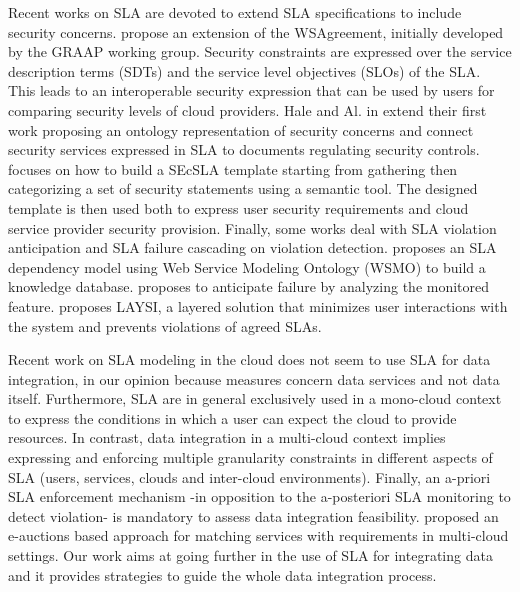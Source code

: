 Recent  works on SLA are devoted to extend  SLA specifications to include  security concerns. 
\cite{6274042} propose an extension of the WSAgreement, initially developed by the GRAAP
working group. 
Security constraints are expressed over the service description
terms (SDTs) and the service level objectives (SLOs) of the SLA. 
This leads to an interoperable security expression that can be used by users for comparing security levels of cloud  providers. 
Hale and Al. in \cite{6655684} extend their first work proposing an ontology representation of security concerns and connect security services expressed in SLA  to documents regulating security controls.
\cite{LunaGarcia:2012:BCS:2381913.2381932} focuses on how to build a SEcSLA template starting from gathering then categorizing a set of security statements using a semantic tool. 
The designed template is then used both to express user security requirements and cloud service provider security provision.
Finally, some works  deal with SLA violation anticipation and SLA failure cascading on violation detection.  \cite{Dastjerdi:2012:DOA:2275356.2275360}  proposes an SLA dependency model using Web Service Modeling Ontology (WSMO) to build a knowledge database. 
\cite{5614035} proposes to anticipate failure by analyzing the monitored feature. 
\cite{5614035} proposes LAYSI, a layered solution that minimizes user interactions with the system and prevents violations of agreed SLAs.

 Recent work on SLA modeling in the cloud does not seem to use SLA for data integration, in our opinion because measures concern data services and not data itself.
Furthermore, SLA are in general exclusively used in a mono-cloud context to express the conditions in which a user can expect the cloud to provide resources. In contrast,  data integration in a multi-cloud context implies  expressing and enforcing multiple granularity constraints in different aspects of SLA (users, services, clouds and inter-cloud environments).  
Finally,  an a-priori SLA enforcement mechanism -in opposition to the a-posteriori SLA monitoring to detect violation-  is mandatory to assess data integration feasibility. 
\cite{anisetti2014auctions} proposed an e-auctions based approach for matching services with requirements in multi-cloud settings. 
Our work aims at going further in the use of SLA for integrating data and it provides strategies to guide the whole data integration process.

 



